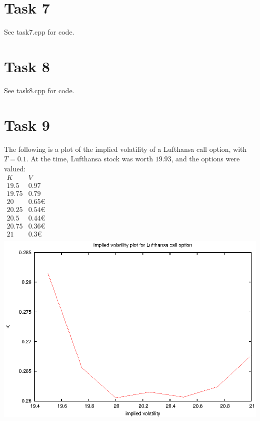 \documentclass[]{article}
\begin{document}
\section*{Task 7}
See task7.cpp for code.

\section*{Task 8}
See task8.cpp for code.

\section*{Task 9}
The following is a plot of the implied volatility of a Lufthansa call option, with $T=0.1$. At the time, Lufthansa stock was worth $19.93$, and the options were valued:\\
$\begin{array}{c|c}
K & V\\
\hline
19.5&0.97\\
19.75&0.79\\
20&0.65€\\
20.25&0.54€\\
20.5&0.44€\\
20.75&0.36€\\
21&0.3€\\
\end{array}$\\
\includegraphics[width=.9\textwidth]{task9.eps}\\
\end{document}
